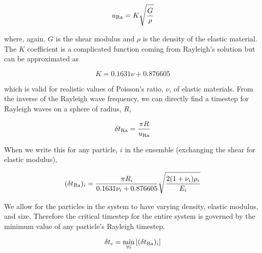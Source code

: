 \begin{equation}
	u_{\mathrm{Ra}} = K\sqrt{\frac{G}{\rho}}
\end{equation}

where, again, $G$ is the shear modulus and $\rho$ is the density of the elastic material. The $K$ coefficient is a complicated function coming from Rayleigh's solution but can be approximated as\cite{Sheng2004}

\begin{equation}
	K = 0.1631 \nu + 0.876605
\end{equation}

which is valid for realistic values of Poisson's ratio, $\nu$, of elastic materials. From the inverse of the Rayleigh wave frequency, we can directly find a timestep for Rayleigh waves on a sphere of radius, $R$,

\begin{equation}\label{eq:rayleigh-stability-time}
	\delta t_{\mathrm{Ra}} = \frac{\pi R}{u_{\mathrm{Ra}}}
\end{equation}

When we write this for any particle, $i$ in the ensemble (exchanging the shear for elastic modulus),

\begin{equation}\label{eq:rayleigh-timestep}
	(\delta t_{\mathrm{Ra}})_i = \frac{\pi R_i }{0.1631 \nu_i + 0.876605} \sqrt{\frac{2(1+\nu_i)\rho_i}{E_i}}
\end{equation}

We allow for the particles in the system to have varying density, elastic modulus, and size. Therefore the critical timestep for the entire system is governed by the minimum value of any particle's Rayleigh timestep. 

\begin{equation}
	\delta t_c = \min_{\forall i}\left[(\delta t_{\mathrm{Ra}})_i\right]
\end{equation}




